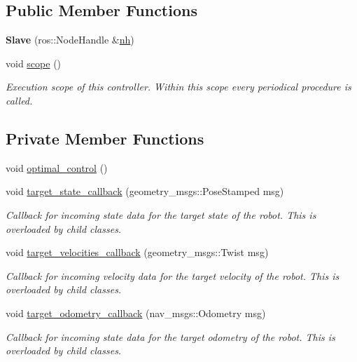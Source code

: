 \subsection*{Public Member Functions}
\begin{DoxyCompactItemize}
\item 
{\bfseries Slave} (ros\+::\+Node\+Handle \&\hyperlink{classController_a24e3d3c2536f6ed29018bad1fd53dae2}{nh})\hypertarget{classSlave_a855a824b462dd05eddaa8d53b27faea4}{}\label{classSlave_a855a824b462dd05eddaa8d53b27faea4}

\item 
void \hyperlink{classSlave_a9b5d1d499c7bd05d5260fbe5b8afbbb5}{scope} ()\hypertarget{classSlave_a9b5d1d499c7bd05d5260fbe5b8afbbb5}{}\label{classSlave_a9b5d1d499c7bd05d5260fbe5b8afbbb5}

\begin{DoxyCompactList}\small\item\em Execution scope of this controller. Within this scope every periodical procedure is called. \end{DoxyCompactList}\end{DoxyCompactItemize}
\subsection*{Private Member Functions}
\begin{DoxyCompactItemize}
\item 
void \hyperlink{classSlave_a2a38a730d6ac93fcced035a7d764612d}{optimal\+\_\+control} ()
\item 
void \hyperlink{classSlave_a09394d0f823a06e04f6259ee490bc867}{target\+\_\+state\+\_\+callback} (geometry\+\_\+msgs\+::\+Pose\+Stamped msg)
\begin{DoxyCompactList}\small\item\em Callback for incoming state data for the target state of the robot. This is overloaded by child classes. \end{DoxyCompactList}\item 
void \hyperlink{classSlave_a2227f30ab058b623de7f6a940d079c90}{target\+\_\+velocities\+\_\+callback} (geometry\+\_\+msgs\+::\+Twist msg)
\begin{DoxyCompactList}\small\item\em Callback for incoming velocity data for the target velocity of the robot. This is overloaded by child classes. \end{DoxyCompactList}\item 
void \hyperlink{classSlave_a0d732637d1c0d06c214112a381ead6be}{target\+\_\+odometry\+\_\+callback} (nav\+\_\+msgs\+::\+Odometry msg)
\begin{DoxyCompactList}\small\item\em Callback for incoming state data for the target odometry of the robot. This is overloaded by child classes. \end{DoxyCompactList}\end{DoxyCompactItemize}
